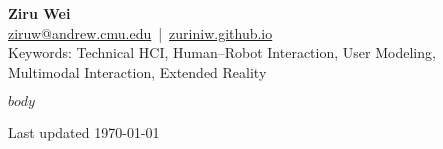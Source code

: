 \documentclass[a4paper,9pt]{extarticle}
\begin{document}
\pagestyle{empty}

    \begin{center}
        {\Huge\bfseries Ziru Wei}\\[6pt]
        {\large
          \href{mailto:ziruw@andrew.cmu.edu}{ziruw@andrew.cmu.edu} \,|\, 
          \href{https://zuriniw.github.io}{zuriniw.github.io}
        }\\[6pt]
        {\small {Keywords: Technical HCI, Human–Robot Interaction,   
        User Modeling, Multimodal Interaction, Extended Reality}}
    \end{center}
    \vspace{0.5em}
    
    

$body$

\vfill
\begin{center}
\small{Last updated \today}
\end{center}
\end{document}
